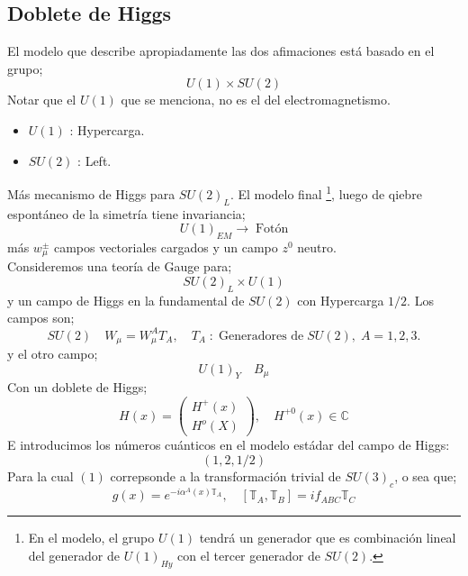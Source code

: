 \documentclass[../main.tex]{subfiles}
\begin{document}
\subsection{Doblete de Higgs}
El modelo que describe apropiadamente las dos afimaciones está basado en el grupo;
\begin{equation}
  U(1)\times SU(2)
 \end{equation}
 Notar que el $U(1)$ que se menciona, no es el del electromagnetismo. 
 \begin{itemize}
   \item $U(1)$ : Hypercarga.
   \item $SU(2)$ : Left. 
 \end{itemize}
 Más mecanismo de Higgs para $SU(2)_L$. El modelo final \footnote{En el modelo, el grupo $U(1)$ tendrá un generador que es combinación lineal del generador de $U(1)_{Hy}$ con el tercer generador de $SU(2)$. }, luego de qiebre espontáneo de la simetría tiene invariancia;
 \begin{equation}
   U(1)_{EM}\rightarrow \; \text{Fotón}
  \end{equation}
  más $w^{\pm}_\mu$ campos vectoriales cargados y un campo $z^0$ neutro. \\
  Consideremos una teoría de Gauge para;
  \begin{equation}
    SU(2)_L\times U(1)
   \end{equation}
y un campo de Higgs en la fundamental de $SU(2)$ con Hypercarga $1/2$. Los campos son;
\begin{equation}
  SU(2) \quad W_\mu = W^A_\mu T_A, \quad T_A \; : \; \text{Generadores de}\; SU(2), \; A=1,2,3.
 \end{equation}
 y el otro campo;
 \begin{equation}
   U(1)_Y\quad B_\mu 
  \end{equation}
Con un doblete de Higgs;
\begin{equation}
  H(x) = \begin{pmatrix}
    H^+(x) \\ H^o(X)
  \end{pmatrix},\quad H^{+0}(x) \in \mathbb{C}
 \end{equation}
E introducimos los números cuánticos en el modelo estádar del campo de Higgs:
\begin{equation}
  \left( 1,2,1/2 \right)
 \end{equation}
 Para la cual $(1)$ correpsonde a la transformación trivial de $SU(3)_c$, o sea que;
 \begin{equation}
   g(x) = e^{-i\alpha^A(x)\mathbb{T}_A}, \quad \left[ \mathbb{T}_A , \mathbb{T}_B \right] = if_{ABC}\mathbb{T}_C
\end{equation}
\end{document}

